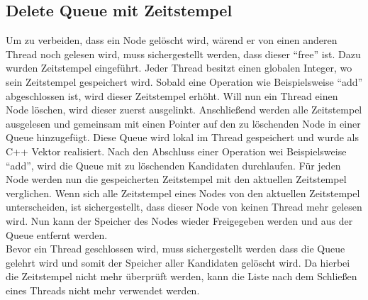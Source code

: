 \subsection{Delete Queue mit Zeitstempel}
Um zu verbeiden, dass ein Node gelöscht wird, wärend er von einen anderen Thread noch gelesen wird, muss sichergestellt werden, dass dieser ``free'' ist. 
Dazu wurden Zeitstempel eingeführt. Jeder Thread besitzt einen globalen Integer, wo sein Zeitstempel gespeichert wird. Sobald eine Operation
wie Beispielsweise ``add'' abgeschlossen ist, wird dieser Zeitstempel erhöht.  Will nun ein Thread einen Node löschen, wird dieser zuerst ausgelinkt. 
Anschließend werden alle Zeitstempel ausgelesen und gemeinsam mit einen Pointer auf den zu löschenden Node in einer Queue hinzugefügt. Diese 
Queue wird lokal im Thread gespeichert und wurde als C++ Vektor realisiert. Nach den Abschluss einer Operation wei Beispielsweise ``add'', wird 
die Queue mit zu löschenden Kandidaten durchlaufen. Für jeden Node werden nun die gespeicherten Zeitstempel mit den aktuellen Zeitstempel verglichen. 
Wenn sich alle Zeitstempel eines Nodes von den aktuellen Zeitstempel unterscheiden, ist sichergestellt, dass dieser Node von keinen Thread mehr gelesen wird. 
Nun kann der Speicher des Nodes wieder Freigegeben werden und aus der Queue entfernt werden. 
\\Bevor ein Thread geschlossen wird, muss sichergestellt werden
dass die Queue gelehrt wird und somit der Speicher aller Kandidaten gelöscht wird. Da hierbei die Zeitstempel nicht mehr überprüft werden,
kann die Liste nach dem Schließen eines Threads nicht mehr verwendet werden. 